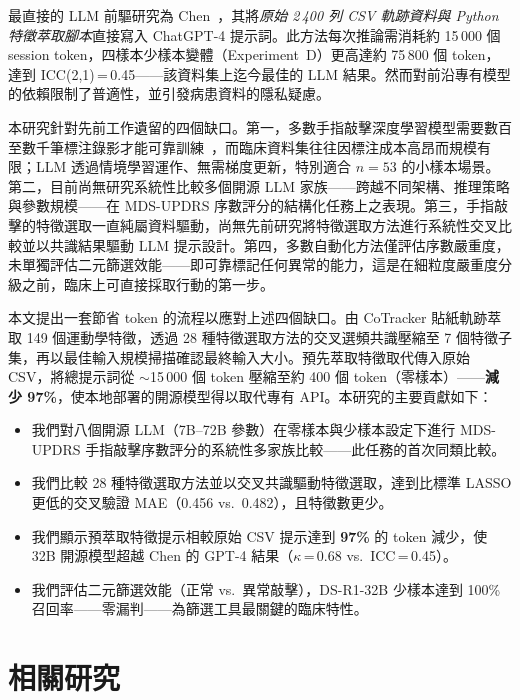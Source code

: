 \documentclass[12pt, a4paper]{article}
\begin{document}
最直接的 LLM 前驅研究為 Chen~\cite{chen2024chatgpt}，其將\emph{原始 2\,400 列 CSV 軌跡資料與 Python 特徵萃取腳本}直接寫入 ChatGPT-4 提示詞。此方法每次推論需消耗約 15\,000 個 session token，四樣本少樣本變體（Experiment~D）更高達約 75\,800 個 token，達到 ICC(2,1)\,=\,0.45——該資料集上迄今最佳的 LLM 結果。然而對前沿專有模型的依賴限制了普適性，並引發病患資料的隱私疑慮。

本研究針對先前工作遺留的四個缺口。第一，多數手指敲擊深度學習模型需要數百至數千筆標注錄影才能可靠訓練~\cite{li2021automated,yang2024deep}，而臨床資料集往往因標注成本高昂而規模有限；LLM 透過情境學習運作、無需梯度更新，特別適合 $n = 53$ 的小樣本場景。第二，目前尚無研究系統性比較多個開源 LLM 家族——跨越不同架構、推理策略與參數規模——在 MDS-UPDRS 序數評分的結構化任務上之表現。第三，手指敲擊的特徵選取一直純屬資料驅動，尚無先前研究將特徵選取方法進行系統性交叉比較並以共識結果驅動 LLM 提示設計。第四，多數自動化方法僅評估序數嚴重度，未單獨評估二元篩選效能——即可靠標記任何異常的能力，這是在細粒度嚴重度分級之前，臨床上可直接採取行動的第一步。

本文提出一套節省 token 的流程以應對上述四個缺口。由 CoTracker 貼紙軌跡萃取 149 個運動學特徵，透過 28 種特徵選取方法的交叉選頻共識壓縮至 7 個特徵子集，再以最佳輸入規模掃描確認最終輸入大小。預先萃取特徵取代傳入原始 CSV，將總提示詞從 $\sim$15\,000 個 token 壓縮至約 400 個 token（零樣本）——\textbf{減少 97\%}，使本地部署的開源模型得以取代專有 API。本研究的主要貢獻如下：

\begin{itemize}
    \item 我們對八個開源 LLM（7B--72B 參數）在零樣本與少樣本設定下進行 MDS-UPDRS 手指敲擊序數評分的系統性多家族比較——此任務的首次同類比較。
    \item 我們比較 28 種特徵選取方法並以交叉共識驅動特徵選取，達到比標準 LASSO 更低的交叉驗證 MAE（0.456 vs.\ 0.482），且特徵數更少。
    \item 我們顯示預萃取特徵提示相較原始 CSV 提示達到 \textbf{97\%} 的 token 減少，使 32B 開源模型超越 Chen 的 GPT-4 結果（$\kappa$\,=\,0.68 vs.\ ICC\,=\,0.45）。
    \item 我們評估二元篩選效能（正常 vs.\ 異常敲擊），DS-R1-32B 少樣本達到 100\% 召回率——零漏判——為篩選工具最關鍵的臨床特性。
\end{itemize}

\section{相關研究}
\end{document}
